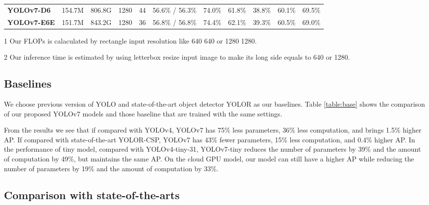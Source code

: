 \documentclass[10pt,twocolumn,letterpaper]{article}
\begin{document}
\begin{table*}[t]
\begin{threeparttable}[t]
\begin{tabular}{l|c|c|c|c|c|ccccc}
					\textbf{YOLOv7-D6} & 154.7M & 806.8G & 1280 & 44 & 56.6\% / 56.3\% & 74.0\% & 61.8\% & 38.8\% & 60.1\% & 69.5\% \\
					\textbf{YOLOv7-E6E} & 151.7M & 843.2G & 1280 & 36 & 56.8\% / 56.8\% & 74.4\% & 62.1\% & 39.3\% & 60.5\% & 69.0\% \\
					\bottomrule
				\end{tabular}
				\begin{tablenotes}[flushleft]
				\footnotesize
				\item[1] Our FLOPs is calaculated by rectangle input resolution like 640  640 or 1280  1280. 
				\item[2] Our inference time is estimated by using letterbox resize input image to make its long side equals to 640 or 1280. 
				\end{tablenotes}
			\end{threeparttable}
		\vspace{-4mm}
		\end{table*}
		
		\subsection{Baselines}
		
		We choose previous version of YOLO \cite{bochkovskiy2020yolov4, wang2021scaled} and state-of-the-art object detector YOLOR \cite{wang2021you} as our baselines. Table \ref{table:base} shows the comparison of our proposed YOLOv7 models and those baseline that are trained with the same settings.
		
		From the results we see that if compared with YOLOv4, YOLOv7 has 75\% less parameters, 36\% less computation, and brings 1.5\% higher AP. If compared with state-of-the-art YOLOR-CSP, YOLOv7 has 43\% fewer parameters, 15\% less computation, and 0.4\% higher AP. In the performance of tiny model, compared with YOLOv4-tiny-31, YOLOv7-tiny reduces the number of parameters by 39\% and the amount of computation by 49\%, but maintains the same AP. On the cloud GPU model, our model can still have a higher AP while reducing the number of parameters by 19\% and the amount of computation by 33\%.
		
		\newpage
		
		\subsection{Comparison with state-of-the-arts}
		
\end{document}
